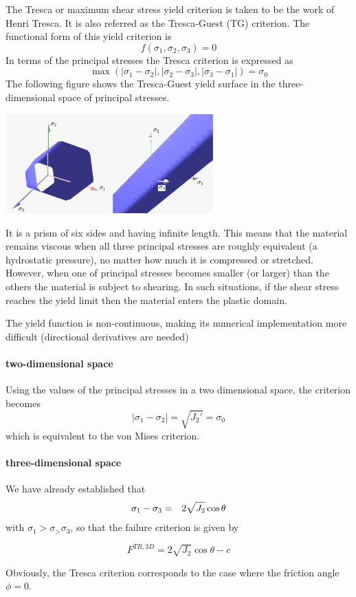 The Tresca or maximum shear stress yield criterion is taken to be the work of Henri Tresca. It is also referred as the Tresca-Guest (TG) criterion. The functional form of this yield criterion is
\[
f(\sigma_1,\sigma_2,\sigma_3) = 0
\]
In terms of the principal stresses the Tresca criterion is expressed as
\[
{\max(|\sigma_1 - \sigma_2| , |\sigma_2 - \sigma_3| , |\sigma_3 - \sigma_1| ) = \sigma_0 }
\]
The following figure shows the Tresca-Guest yield surface in the three-dimensional space of principal stresses. 
\begin{center}
\includegraphics[width=0.6\textwidth]{images/rheology/tresca/Tresca.pdf}
\end{center}
It is a prism of six sides and having infinite length. This means that the material remains viscous when all three principal stresses are roughly equivalent (a hydrostatic pressure), no matter how much it is compressed or stretched. However, when one of principal stresses becomes smaller (or larger) than the others the material is subject to shearing. In such situations, if the shear stress reaches the yield limit then the material enters the plastic domain. 

\begin{remark}
The yield function is non-continuous, making its numerical implementation more difficult (directional derivatives are needed)
\end{remark}

\paragraph{two-dimensional space}
Using the values of the principal stresses in a two dimensional space, the criterion becomes 
\[
|\sigma_1 - \sigma_2| =\sqrt{J_2'}  = \sigma_0 
\]
which is equivalent to the von Mises criterion.


\paragraph{three-dimensional space}
We have already established that 
\begin{eqnarray}
\sigma_1 - \sigma_3  &=& 2 \sqrt{J_2} \cos \theta \nonumber
\end{eqnarray}
with $\sigma_1>\sigma_>\sigma_3$,
so that the failure criterion is given by

\begin{mdframed}[backgroundcolor=blue!5]
\[
F^{TR,3D}=2\sqrt{J_2}\cos \theta - c 
\]
\end{mdframed}

Obviously, the Tresca criterion corresponds to the case where the friction angle $\phi=0$.


